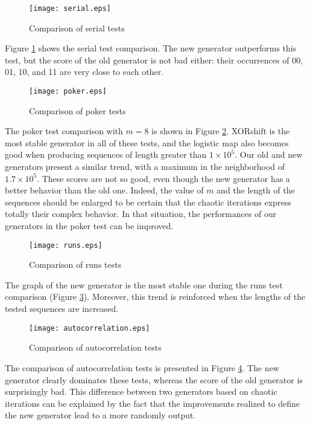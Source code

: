 \documentclass[journal]{IEEEtran}
\begin{document}
\begin{figure}
\centering
\texttt{[image: serial.eps]}
\caption{Comparison of serial tests}
\label{serial}
\end{figure}

Figure \ref{serial} shows the serial test comparison. The new generator outperforms this test, but the score of the old generator is not bad either: their occurrences of 00, 01, 10, and 11 are very close to each other.

\begin{figure}
\centering
\texttt{[image: poker.eps]}
\caption{Comparison of poker tests}
\label{poker}
\end{figure}

The poker test comparison with $m=8$ is shown in Figure \ref{poker}. XORshift is the most stable generator in all of these tests, and the logistic map also becomes good when producing sequences of length greater than $1 \times 10^5$. 
Our old and new generators present a similar trend, with a maximum in the neighborhood of $1.7 \times 10^5$. These scores are not so good, even though the new generator has a better behavior than the old one. 
Indeed, the value of $m$ and the length of the sequences should be enlarged to be certain that the chaotic iterations express totally their complex behavior. In that situation, the performances of our generators in the poker test can be improved.


\begin{figure}
\centering
\texttt{[image: runs.eps]}
\caption{Comparison of runs tests}
\label{runs}
\end{figure}

The graph of the new generator is the most stable one during the runs test comparison (Figure \ref{runs}). Moreover, this trend is reinforced when the lengths of the tested sequences are increased.


\begin{figure}
\centering
\texttt{[image: autocorrelation.eps]}
\caption{Comparison of autocorrelation tests}
\label{autocorrelation}
\end{figure}


The comparison of autocorrelation tests is presented in Figure \ref{autocorrelation}. The new generator clearly dominates these tests, whereas the score of the old generator is surprisingly bad. This difference between two generators based on chaotic iterations can be explained by the fact that the improvements realized to define the new generator lead to a more randomly output.
\end{document}

